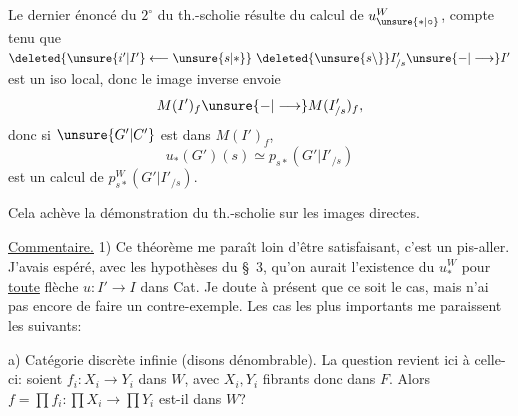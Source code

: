 Le dernier énoncé du $2^\circ$ du th.-scholie résulte du calcul de $u_{\unsure{*|\circ}}^W$, compte tenu que $\deleted{\unsure{i'|I'}\longleftarrow\unsure{s|*}}\ \deleted{\unsure{s\backslash}}I'_{/s}\unsure{-|\longrightarrow}I'$ est un iso local, donc le  image inverse  envoie
\[
M(I')_f\unsure{-|\longrightarrow}M(I'_{/s})_f,
\]
donc si $\unsure{G'|C'}$ est dans $M(I')_f$,
\[
u_*(G')(s)\simeq p_{s*}(G'|I'_{/s})
\]
est un calcul de $p_{s*}^W(G'|I'_{/s})$.

Cela achève la démonstration du th.-scholie sur les images directes.

\uline{Commentaire.} 1) Ce théorème me paraît loin d'être satisfaisant, c'est un pis-aller. J'avais espéré, avec les hypothèses du \S\ 3, qu'on aurait l'existence du $u_*^W$ pour \uline{toute} flèche $u:I'\to I$ dans Cat. Je doute à présent que ce soit le cas, mais n'ai pas encore  de faire un contre-exemple. Les cas les plus importants  me paraissent les suivants:

a) Catégorie  discrète infinie (disons dénombrable). La question revient ici à celle-ci: soient $f_i:X_i\to Y_i$ dans $W$, avec $X_i,Y_i$ fibrants donc dans $F$. Alors $f=\prod f_i:\prod X_i\to\prod Y_i$ est-il dans $W$?
